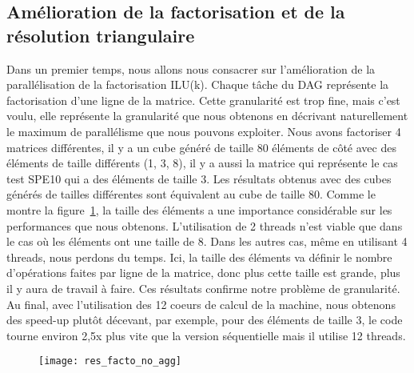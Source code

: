 \subsection{Amélioration de la factorisation et de la résolution triangulaire}
Dans un premier temps, nous allons nous consacrer sur l'amélioration de la parallélisation de la factorisation ILU(k).
%
Chaque tâche du DAG représente la factorisation d'une ligne de la matrice.
%
Cette granularité est trop fine, mais c'est voulu, elle représente la granularité que nous obtenons en décrivant naturellement le maximum  de parallélisme que nous pouvons exploiter.
%
Nous avons factoriser 4 matrices différentes, il y a un cube généré de taille 80 éléments de côté avec des éléments de taille différents (1, 3, 8), il y a aussi la matrice qui représente le cas test SPE10 qui a des éléments de taille 3.
%
Les résultats obtenus avec des cubes générés de tailles différentes sont équivalent au cube de taille 80.
%
Comme le montre la figure~\ref{fig:res_facto_no_agg}, la taille des éléments a une importance considérable sur les performances que nous obtenons.
%
L'utilisation de 2 threads n'est viable que dans le cas où les éléments ont une taille de 8.
%
Dans les autres cas, même en utilisant 4 threads, nous perdons du temps.
%
Ici, la taille des éléments va définir le nombre d'opérations faites par ligne de la matrice, donc plus cette taille est grande, plus il y aura de travail à faire.
%
Ces résultats confirme notre problème de granularité.
%
Au final, avec l'utilisation des 12 coeurs de calcul de la machine, nous obtenons des speed-up plutôt décevant, par exemple, pour des éléments de taille 3, le code tourne environ 2,5x plus vite que la version séquentielle mais il utilise 12 threads.


\begin{figure}[t!]
  \centering
  \texttt{[image: res\_facto\_no\_agg]}
  \caption{}
  \label{fig:res_facto_no_agg}
\end{figure}
